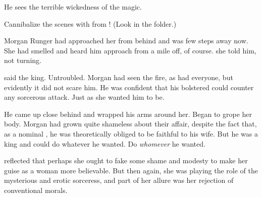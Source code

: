 He sees the terrible wickedness of the \EreshKali{} magic.


Cannibalize the scenes with \Takestsha from ! 
(Look in the  folder.)

\begin{prose}
  Morgan Runger had approached her from behind and was few steps away now. 
  She had smelled and heard him approach from a mile off, of course. 
   she told him, not turning. 
  
   said the king. 
  Untroubled. 
  Morgan had seen the fire, as had everyone, but evidently it did not scare him. 
  He was confident that his bolstered \ishrah{} could counter any sorcerous attack. 
  Just as she wanted him to be. 
  
  He came up close behind and wrapped his arms around her. 
  Began to grope her body. 
  Morgan had grown quite shameless about their affair, despite the fact that, as a nominal \Iquinian, he was theoretically obliged to be faithful to his wife. 
  But he was a king and could do whatever he wanted. 
  Do \emph{whomever} he wanted. 
  
  \Takestsha{} reflected that perhaps she ought to fake some shame and modesty to make her guise as a \human{} woman more believable. 
  But then again, she was playing the role of the mysterious and erotic sorceress, and part of her allure was her rejection of conventional morals. 
  
\end{prose}






